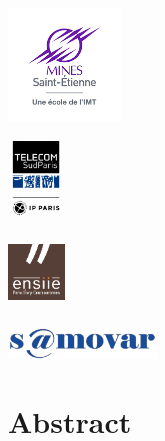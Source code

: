 \documentclass[a4paper,11pt,english,openany]{book}
\begin{document}
\begin{center}
	 \parbox[c]{3cm}{\includegraphics[height=3cm]{Figures/edm.png}} \hspace{.25cm}
	 \parbox[c]{2.5cm}{\includegraphics[width=1.5cm,height=2cm]{Figures/tsp.png}}
	 \parbox[c]{2cm}{\includegraphics[width=1.5cm,height=2cm]{Figures/logo_ENSIIE.png}} 
	 \hspace{.3cm}
	 \parbox[c]{2.5cm}{\includegraphics[height=0.8cm]{Figures/2022_logo_samovar.png}} \hspace{1.5cm}



\vspace*{2em}
        
\end{center}

\newpage
\thispagestyle{empty}
\chapter*{Abstract}





\newpage
\thispagestyle{empty}

\tableofcontents
\listoffigures
{}
\end{document}
